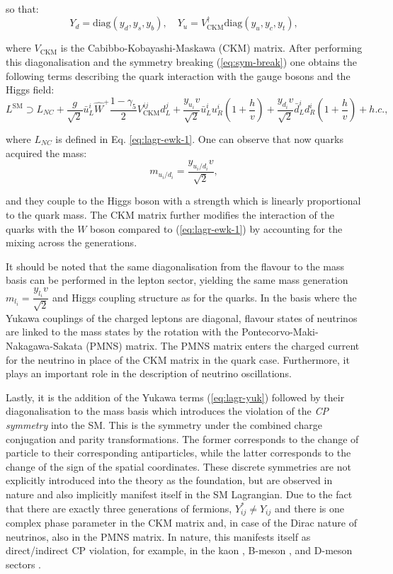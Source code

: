 so that:
\begin{equation}
    Y_d = \text{diag}(y_d, y_s, y_b), \quad Y_u = V_\text{CKM}^\dag\text{diag}(y_u, y_c, y_t),
\end{equation}

where $V_\text{CKM}$ is the Cabibbo-Kobayashi-Maskawa (CKM) matrix. After performing this diagonalisation and the symmetry breaking (\ref{eq:sym-break}) one obtains the following terms describing the quark interaction with the gauge bosons and the Higgs field:
\begin{equation}
    L^\text{SM} \supset L_{NC} + \dfrac{g}{\sqrt{2}}\bar{u}^i_L \hat{W}^+ \dfrac{1-\gamma_5}{2}V_\text{CKM}^{ij}d^j_L + \dfrac{y_{u_i}v}{\sqrt{2}}\bar{u}^i_L u^i_R\left(1+\dfrac{h}{v}\right) + \dfrac{y_{d_i}v}{\sqrt{2}}\bar{d}^i_L d^i_R\left(1+\dfrac{h}{v}\right) + h.c., 
\end{equation}

where $L_{NC}$ is defined in Eq. \ref{eq:lagr-ewk-1}. One can observe that now quarks acquired the mass:
\begin{equation}
    m_{u_i/d_i} = \dfrac{y_{u_i/d_i}v}{\sqrt{2}},
\end{equation}

and they couple to the Higgs boson with a strength which is linearly proportional to the quark mass. The CKM matrix further modifies the interaction of the quarks with the $W$ boson compared to (\ref{eq:lagr-ewk-1}) by accounting for the mixing across the generations.

It should be noted that the same diagonalisation from the flavour to the mass basis can be performed in the lepton sector, yielding the same mass generation $m_{l_i} = \dfrac{y_{l_i} v}{\sqrt{2}}$ and Higgs coupling structure as for the quarks. In the basis where the Yukawa couplings of the charged leptons are diagonal, flavour states of neutrinos are linked to the mass states by the rotation with the Pontecorvo-Maki-Nakagawa-Sakata (PMNS) matrix. The PMNS matrix enters the charged current for the neutrino in place of the CKM matrix in the quark case. Furthermore, it plays an important role in the description of neutrino oscillations.

Lastly, it is the addition of the Yukawa terms (\ref{eq:lagr-yuk}) followed by their diagonalisation to the mass basis which introduces the violation of the \textit{CP symmetry} into the SM. This is the symmetry under the combined charge conjugation and parity transformations. The former corresponds to the change of particle to their corresponding antiparticles, while the latter corresponds to the change of the sign of the spatial coordinates. These discrete symmetries are not explicitly introduced into the theory as the foundation, but are observed in nature and also implicitly manifest itself in the SM Lagrangian. Due to the fact that there are exactly three generations of fermions, $Y_{ij}^* \neq Y_{ij}$ and there is one complex phase parameter in the CKM matrix and, in case of the Dirac nature of neutrinos, also in the PMNS matrix. In nature, this manifests itself as direct/indirect CP violation, for example, in the kaon \cite{KTeV:1999kad}, B-meson \cite{LHCb:2013syl}, and D-meson sectors \cite{LHCb:2019hro}.    

